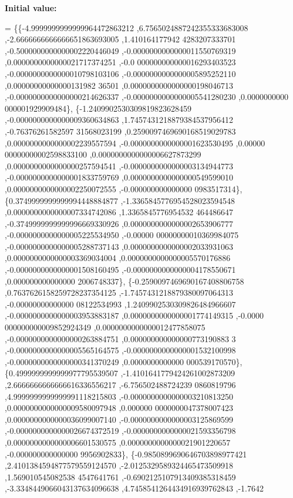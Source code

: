 {\bfseries Initial value\+:}
\begin{DoxyCode}
= \{\{-4.9999999999999964472863212 ,6.7565024887242355333683008 ,-2.6666666666666651863693005 ,1.410164177942
      4283207333701 ,-0.5000000000000002220446049 ,-0.0000000000000011550769319 ,0.0000000000000021717374251 ,-0.0
      000000000000016293403523 ,-0.0000000000000010798103106 ,-0.0000000000000005895252110 ,0.00000000000000131982
      36501 ,0.0000000000000000198046713 ,-0.0000000000000000214626337 ,-0.0000000000000005541280230 ,0.0000000000
      000001929909484\},
\{-1.2409902530309819823628459 ,-0.0000000000000009360634863 ,1.7457431218879384537956412 ,-0.76376261582597
      31568023199 ,0.2590097469690168519029783 ,0.0000000000000002239557594 ,-0.0000000000000001623530495 ,0.00000
      00000000002598833100 ,0.0000000000000006627873299 ,0.0000000000000000257594541 ,-0.0000000000000003134944773
       ,-0.0000000000000001833759769 ,0.0000000000000000549599010 ,0.0000000000000002250072555 ,-0.000000000000000
      0983517314\},
\{0.3749999999999994448884877 ,-1.3365845776954528023594548 ,0.0000000000000007334742086 ,1.3365845776954532
      464486647 ,-0.3749999999999996669330926 ,0.0000000000000002653906777 ,-0.0000000000000005225534950 ,-0.00000
      00000000010369984075 ,-0.0000000000000005288737143 ,0.0000000000000002033931063 ,0.0000000000000003369034004
       ,0.0000000000000005570176886 ,-0.0000000000000001508160495 ,-0.0000000000000004178550671 ,0.000000000000000
      2006748337\},
\{-0.2590097469690167408806758 ,0.7637626158259728237354125 ,-1.7457431218879380097064313 ,-0.00000000000000
      08122534993 ,1.2409902530309826484966607 ,-0.0000000000000003953883187 ,0.0000000000000001774149315 ,-0.0000
      000000000009852924349 ,0.0000000000000012477858075 ,-0.0000000000000000263884751 ,0.000000000000000773190883
      3 ,-0.0000000000000005565164575 ,-0.0000000000000001532100998 ,-0.0000000000000000341370249 ,0.0000000000000
      000539170570\},
\{0.4999999999999977795539507 ,-1.4101641779424261002873209 ,2.6666666666666616336556217 ,-6.756502488724239
      0860819796 ,4.9999999999999991118215803 ,-0.0000000000000003210813250 ,0.0000000000000009580097948 ,0.000000
      0000000047378007423 ,0.0000000000000036099007140 ,-0.0000000000000003125869599 ,-0.0000000000000026674372519
       ,-0.0000000000000021593356798 ,0.0000000000000006601530575 ,0.0000000000000021901220657 ,-0.000000000000000
      9956902833\},
\{-0.9850899690646703898977421 ,2.4101384594877579559124570 ,-2.0125329589324465473509918 ,1.569010545082538
      4547641761 ,-0.6902125107913409385318459 ,-3.3348449066043137634096638 ,4.7458541264434916939762843 ,-1.7642

\end{DoxyCode}
